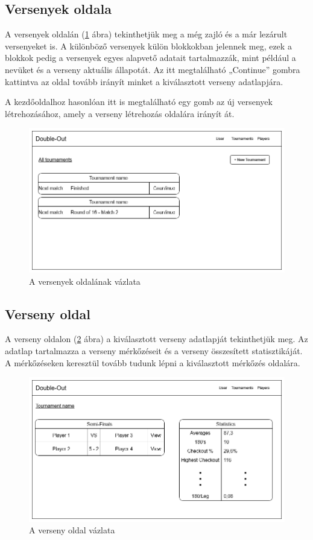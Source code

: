 \subsection{Versenyek oldala}
A versenyek oldalán (\ref{fig:tournaments} ábra) tekinthetjük meg a még zajló és a már lezárult versenyeket is. A különböző versenyek külön blokkokban jelennek meg, ezek a blokkok pedig a versenyek egyes alapvető adatait tartalmazzák, mint például a nevüket és a verseny aktuális állapotát. Az itt megtalálható „Continue” gombra kattintva az oldal tovább irányít minket a kiválasztott verseny adatlapjára.

A kezdőoldalhoz hasonlóan itt is megtalálható egy gomb az új versenyek létrehozásához, amely a verseny létrehozás oldalára irányít át. 

\begin{figure}[h]
\centering
\includegraphics[scale=0.4]{images/Tournaments.png}
\caption{A versenyek oldalának vázlata}
\label{fig:tournaments}
\end{figure}

\subsection{Verseny oldal}
A verseny oldalon (\ref{fig:tournament} ábra) a kiválasztott verseny adatlapját tekinthetjük meg. Az adatlap tartalmazza a verseny mérkőzéseit és a verseny összesített statisztikáját. A mérkőzéseken keresztül tovább tudunk lépni a kiválasztott mérkőzés oldalára.

\begin{figure}[h]
\centering
\includegraphics[scale=0.4]{images/TournamentPage.png}
\caption{A verseny oldal vázlata}
\label{fig:tournament}
\end{figure}

